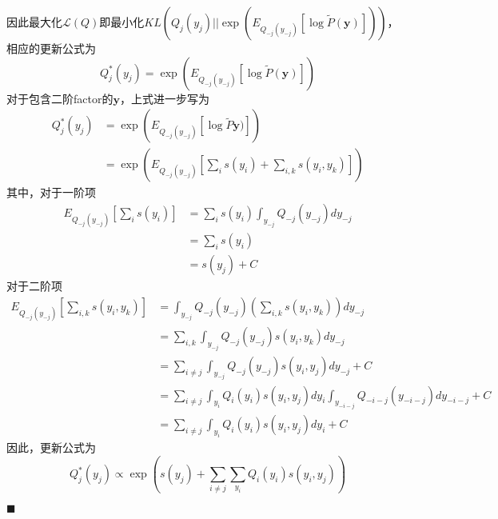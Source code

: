 因此最大化$\mathcal{L}(Q)$即最小化$KL\left(Q_j(y_j)||\exp\left(E_{Q_{-j}(y_{-j})}\left[\log \tilde{P}(\boldsymbol{y}) \right]\right)\right)$，相应的更新公式为
\begin{equation}
  {Q^{\ast}_j(y_j)}=\exp\left(E_{Q_{-j}(y_{-j})}\left[\log \tilde{P}(\boldsymbol{y}) \right]\right)
\end{equation}
对于包含二阶factor的$\boldsymbol{y}$，上式进一步写为
\begin{equation}
  \begin{split}
    {Q^{\ast}_j(y_j)}&=\exp\left(E_{Q_{-j}(y_{-j})}\left[\log \tilde{P}\boldsymbol{y})\right]\right)\\
    &=\exp\left(E_{Q_{-j}(y_{-j})}\left[\sum_i s(y_i)+\sum_{i,k} s(y_i,y_k) \right]\right)
  \end{split}
\end{equation}
其中，对于一阶项
\begin{equation}
  \begin{split}
    E_{Q_{-j}(y_{-j})}\left[\sum_i s(y_i)\right]
    &=\sum_{i}s(y_i) \int_{y_{-j}} Q_{-j}(y_{-j}) dy_{-j}\\
    &=\sum_{i}s(y_i)\\
    &=s(y_j)+C
  \end{split}
\end{equation}
对于二阶项
\begin{equation}
  \begin{split}
    E_{Q_{-j}(y_{-j})}\left[\sum_{i,k} s(y_i,y_k) \right] &=\int_{y_{-j}} Q_{-j}(y_{-j})\left(\sum_{i,k} s(y_i,y_k) \right) dy_{-j}\\
    &=\sum_{i,k}\int_{y_{-j}} Q_{-j}(y_{-j})s(y_i,y_k) dy_{-j}\\
    &=\sum_{i\neq j}{\int_{y_{-j}}Q_{-j}(y_{-j}) s(y_i,y_j)  dy_{-j}} +C\\
    &=\sum_{i\neq j}{\int_{y_i}Q_{i}(y_i) s(y_i,y_j)  dy_i}{\int_{y_{-i-j}}Q_{{-i-j}}(y_{-i-j})   dy_{-i-j}} +C\\
    &=\sum_{i\neq j}{\int_{y_i}Q_{i}(y_i) s(y_i,y_j)  dy_i} +C
  \end{split}
\end{equation}
因此，更新公式为
\begin{equation}
  {Q^{\ast}_j(y_j)}\propto \exp\left(s(y_j) + \sum_{i\neq j}{\sum_{y_i}Q_{i}(y_i) s(y_i,y_j)} \right)
\end{equation}

\noindent$\blacksquare$
